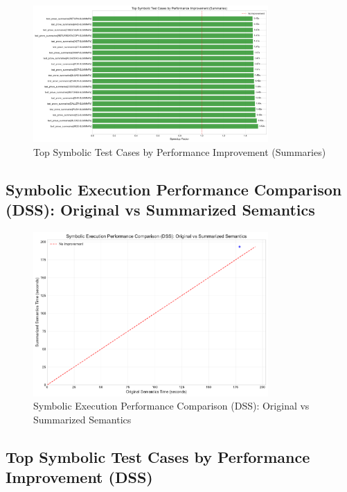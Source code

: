 \documentclass[article]{article}
\begin{document}
\begin{figure}[H]
\centering
\includegraphics[width=0.8\textwidth]{charts/symbolic_summaries_test_case_improvement.pdf}
\caption{Top Symbolic Test Cases by Performance Improvement (Summaries)}
\label{fig:symbolic_summaries_test_case_improvement}
\end{figure}

\newpage

\subsection{Symbolic Execution Performance Comparison (DSS): Original vs Summarized Semantics}\label{fig:symbolic_dss_performance_scatter}

\begin{figure}[H]
\centering
\includegraphics[width=0.8\textwidth]{charts/symbolic_dss_performance_scatter.pdf}
\caption{Symbolic Execution Performance Comparison (DSS): Original vs Summarized Semantics}
\label{fig:symbolic_dss_performance_scatter}
\end{figure}

\newpage

\subsection{Top Symbolic Test Cases by Performance Improvement (DSS)}\label{fig:symbolic_dss_test_case_improvement}
\end{document}
